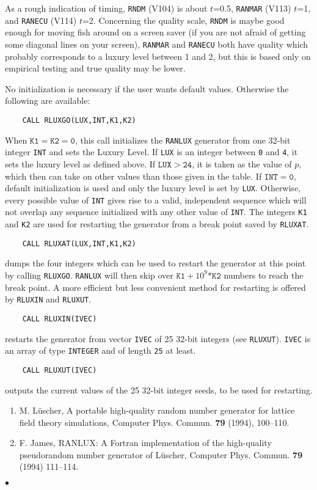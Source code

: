 As a rough indication of timing, {\tt RNDM} (V104) is about $t$=0.5,
{\tt RANMAR} (V113) $t$=1, and {\tt RANECU} (V114) $t$=2.
Concerning the quality scale, {\tt RNDM} is maybe good enough
for moving fish around on a screen saver (if you are not afraid of
getting some diagonal lines on your screen),
{\tt RANMAR} and {\tt RANECU} both have
quality which probably corresponds to a luxury level between 1 and 2, but
this is based only on empirical testing and true quality may be lower.
\par
No initialization is necessary if the user wants default values.
Otherwise the following are available:
\begin{verbatim}
    CALL RLUXGO(LUX,INT,K1,K2)
\end{verbatim}
When $\mathtt{K1=K2=0}$, this call initializes
the {\tt RANLUX} generator from one 32-bit integer {\tt INT} and sets
the Luxury Level. If {\tt LUX} is an integer between {\tt 0} and
{\tt 4}, it sets the luxury level as defined above.
If $\mathtt{LUX > 24}$, it is taken as the value of $p$,
which then can take on other values than those given in the table.
If $\mathtt{INT=0}$, default initialization is used and only the
luxury level is set by {\tt LUX}.  Otherwise, every possible
value of {\tt INT} gives rise to a valid, independent sequence
which will not overlap any sequence initialized with any
other value of {\tt INT}.  The integers {\tt K1} and {\tt K2} are used
for restarting the generator from a break point saved by {\tt RLUXAT}.
\begin{verbatim}
    CALL RLUXAT(LUX,INT,K1,K2)
\end{verbatim}
dumps the four integers which can be used
to restart the generator at this point by calling {\tt RLUXGO}.
{\tt RANLUX} will then skip over $\mathtt{K1}+10^9\mathtt{*K2}$ numbers
to reach the break point. A more efficient but less convenient
method for restarting is offered by {\tt RLUXIN} and {\tt RLUXUT}.
\begin{verbatim}
    CALL RLUXIN(IVEC)
\end{verbatim}
restarts the generator from vector {\tt IVEC} of
25 32-bit integers (see {\tt RLUXUT}).
{\tt IVEC} is an array of type {\tt INTEGER} and
of length {\tt 25} at least.
\begin{verbatim}
    CALL RLUXUT(IVEC)
\end{verbatim}
outputs the current values of the 25 32-bit
integer seeds, to be used for restarting.
\Refer
\begin{enumerate}
\item
M. L\"uscher, A portable high-quality random number generator for
lattice field theory simulations,
Computer Phys. Commun. {\bf 79} (1994), 100--110.
\item F. James, RANLUX: A Fortran implementation of the high-quality
pseudorandom number generator of L\"uscher,
Computer Phys. Commun. {\bf 79} (1994) 111--114.
\end{enumerate}
$\bullet$
